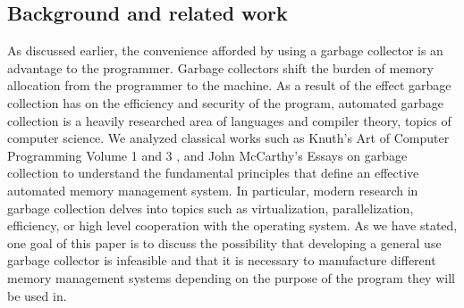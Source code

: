 \documentclass[11pt,leqno]{article}
\begin{document}
\subsection{Background and related work}
As discussed earlier, the convenience afforded by using a garbage collector is an advantage to the programmer. Garbage collectors shift the burden of memory allocation from the programmer to the machine. As a result of the effect garbage collection has on the efficiency and security of the program, automated garbage collection is a heavily researched area of languages and compiler theory, topics of computer science. We analyzed classical works such as Knuth’s Art of Computer Programming Volume 1 and 3 \cite{knuth3}, and John McCarthy’s Essays on garbage collection \cite{mccarthy} to understand the fundamental principles that define an effective automated memory management system. In particular, modern research in garbage collection delves into topics such as virtualization, parallelization, efficiency, or high level cooperation with the operating system. As we have stated, one goal of this paper is to discuss the possibility that developing a general use garbage collector is infeasible and that it is necessary to manufacture different memory management systems depending on the purpose of the program they will be used in.
\end{document}
